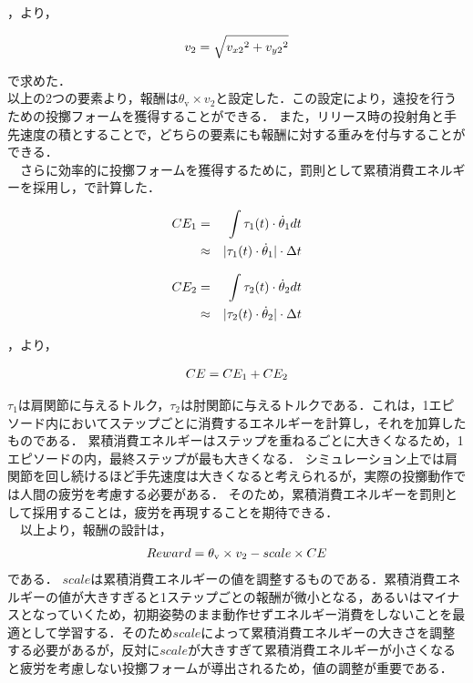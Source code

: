 ，より，

\begin{eqnarray}
  \equlabel{2.22}
  v_{2}=\sqrt{{v_{x2}}^2+{v_{y2}}^2}
\end{eqnarray}

で求めた．\\

以上の2つの要素より，報酬は$\theta_{\mathrm{v}} \times v_{2}$と設定した．この設定により，遠投を行うための投擲フォームを獲得することができる．
また，リリース時の投射角と手先速度の積とすることで，どちらの要素にも報酬に対する重みを付与することができる．\\
　さらに効率的に投擲フォームを獲得するために，罰則として累積消費エネルギーを採用し，で計算した．

\begin{eqnarray}
  \equlabel{2.23}
  CE_{1}&=&\int \tau_{1}(t)\cdot\dot{\theta}_{1} dt \nonumber \\
        &\approx&|\tau_{1}(t)\cdot\dot{\theta}_{1}|\cdot\Delta t
\end{eqnarray}

\begin{eqnarray}
  \equlabel{2.24}
  CE_{2}&=&\int \tau_{2}(t)\cdot\dot{\theta}_{2} dt \nonumber \\
        &\approx&|\tau_{2}(t)\cdot\dot{\theta}_{2}|\cdot\Delta t
\end{eqnarray}

，より，

\begin{eqnarray}
  \equlabel{2.25}
  CE = CE_{1} + CE_{2}
\end{eqnarray}

$\tau_{1}$は肩関節に与えるトルク，$\tau_{2}$は肘関節に与えるトルクである．これは，1エピソード内においてステップごとに消費するエネルギーを計算し，それを加算したものである．
累積消費エネルギーはステップを重ねるごとに大きくなるため，1エピソードの内，最終ステップが最も大きくなる．
シミュレーション上では肩関節を回し続けるほど手先速度は大きくなると考えられるが，実際の投擲動作では人間の疲労を考慮する必要がある．
そのため，累積消費エネルギーを罰則として採用することは，疲労を再現することを期待できる．\\
　以上より，報酬の設計は，
\begin{eqnarray}
  \equlabel{2.26}
  Reward = \theta_{\mathrm{v}} \times v_{2} - scale \times CE
\end{eqnarray}
である．
$scale$は累積消費エネルギーの値を調整するものである．累積消費エネルギーの値が大きすぎると1ステップごとの報酬が微小となる，あるいはマイナスとなっていくため，初期姿勢のまま動作せずエネルギー消費をしないことを最適として学習する．そのため$scale$によって累積消費エネルギーの大きさを調整する必要があるが，反対に$scale$が大きすぎて累積消費エネルギーが小さくなると疲労を考慮しない投擲フォームが導出されるため，値の調整が重要である．
